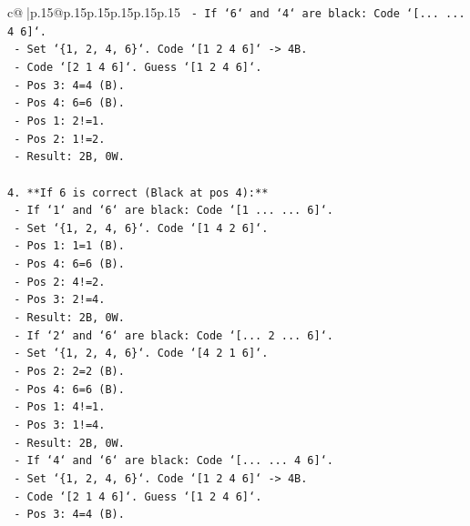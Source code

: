 \documentclass{article}
\begin{document}
{\begin{supertabular}{c@{$\;$}|p{.15\linewidth}@{}p{.15\linewidth}p{.15\linewidth}p{.15\linewidth}p{.15\linewidth}p{.15\linewidth}}
{{{\texttt{    {-}   If `6` and `4` are black: Code `{[}... ... 4 6{]}`.} \\
\texttt{        {-}   Set `\{1, 2, 4, 6\}`. Code `{[}1 2 4 6{]}` {-}> 4B.} \\
\texttt{        {-}   Code `{[}2 1 4 6{]}`. Guess `{[}1 2 4 6{]}`.} \\
\texttt{            {-}   Pos 3: 4=4 (B).} \\
\texttt{            {-}   Pos 4: 6=6 (B).} \\
\texttt{            {-}   Pos 1: 2!=1.} \\
\texttt{            {-}   Pos 2: 1!=2.} \\
\texttt{            {-}   Result: 2B, 0W.} \\
\\ 
\texttt{4.  **If 6 is correct (Black at pos 4):**} \\
\texttt{    {-}   If `1` and `6` are black: Code `{[}1 ... ... 6{]}`.} \\
\texttt{        {-}   Set `\{1, 2, 4, 6\}`. Code `{[}1 4 2 6{]}`.} \\
\texttt{            {-}   Pos 1: 1=1 (B).} \\
\texttt{            {-}   Pos 4: 6=6 (B).} \\
\texttt{            {-}   Pos 2: 4!=2.} \\
\texttt{            {-}   Pos 3: 2!=4.} \\
\texttt{            {-}   Result: 2B, 0W.} \\
\texttt{    {-}   If `2` and `6` are black: Code `{[}... 2 ... 6{]}`.} \\
\texttt{        {-}   Set `\{1, 2, 4, 6\}`. Code `{[}4 2 1 6{]}`.} \\
\texttt{            {-}   Pos 2: 2=2 (B).} \\
\texttt{            {-}   Pos 4: 6=6 (B).} \\
\texttt{            {-}   Pos 1: 4!=1.} \\
\texttt{            {-}   Pos 3: 1!=4.} \\
\texttt{            {-}   Result: 2B, 0W.} \\
\texttt{    {-}   If `4` and `6` are black: Code `{[}... ... 4 6{]}`.} \\
\texttt{        {-}   Set `\{1, 2, 4, 6\}`. Code `{[}1 2 4 6{]}` {-}> 4B.} \\
\texttt{        {-}   Code `{[}2 1 4 6{]}`. Guess `{[}1 2 4 6{]}`.} \\
\texttt{            {-}   Pos 3: 4=4 (B).} \\
}}}
\end{supertabular}}
\end{document}
